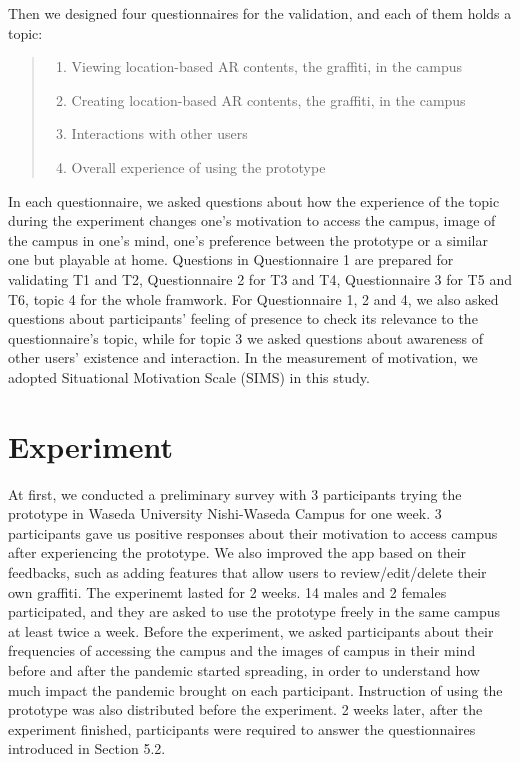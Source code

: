 Then we designed four questionnaires for the validation, and each of them holds a topic:

\begin{quote}
  \begin{enumerate}
    \item Viewing location-based AR contents, the graffiti, in the campus
    \item Creating location-based AR contents, the graffiti, in the campus
    \item Interactions with other users
    \item Overall experience of using the prototype
  \end{enumerate}
\end{quote}

In each questionnaire, we asked questions about how the experience of the topic during the experiment changes one's motivation to access the campus, image of the campus in one's mind, one's preference between the prototype or a similar one but playable at home.
Questions in Questionnaire 1 are prepared for validating T1 and T2, Questionnaire 2 for T3 and T4, Questionnaire 3 for T5 and T6, topic 4 for the whole framwork.
For Questionnaire 1, 2 and 4, we also asked questions about participants' feeling of presence to check its relevance to the questionnaire's topic, while for topic 3 we asked questions about awareness of other users' existence and interaction.
In the measurement of motivation, we adopted Situational Motivation Scale (SIMS) \cite{guay_vallerand_blanchard_2000} in this study.

\section{Experiment}

At first, we conducted a preliminary survey with 3 participants trying the prototype in Waseda University Nishi-Waseda Campus for one week.
3 participants gave us positive responses about their motivation to access campus after experiencing the prototype.
We also improved the app based on their feedbacks, such as adding features that allow users to review/edit/delete their own graffiti.
The experinemt lasted for 2 weeks. 14 males and 2 females participated,
and they are asked to use the prototype freely in the same campus at least twice a week.
Before the experiment, we asked participants about their frequencies of accessing the campus and the images of campus in their mind before and after the pandemic started spreading,
in order to understand how much impact the pandemic brought on each participant.
Instruction of using the prototype was also distributed before the experiment.
2 weeks later, after the experiment finished, participants were required to answer the questionnaires introduced in Section 5.2.


